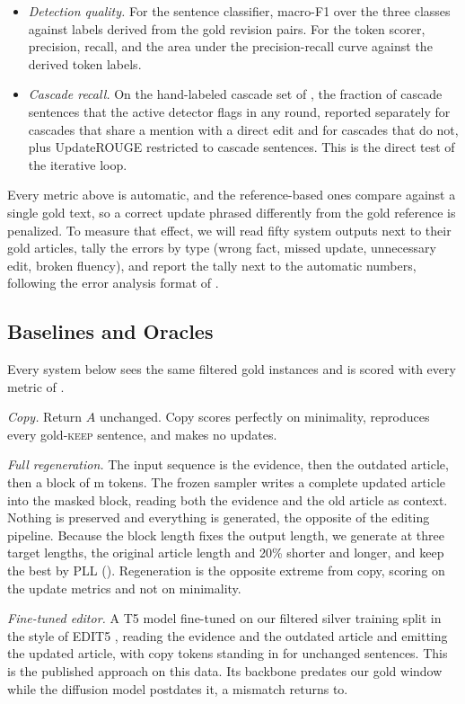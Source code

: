 \documentclass[]{paper}
\newcommand{\mask}{\ensuremath{\mathrm{m}}}
\newcommand{\keep}{\textsc{keep}}
\begin{document}
\begin{itemize}
\item \emph{Detection quality.} For the sentence classifier, macro-F1 over the three classes against labels derived from the gold revision pairs. For the token scorer, precision, recall, and the area under the precision-recall curve against the derived token labels.
\item \emph{Cascade recall.} On the hand-labeled cascade set of , the fraction of cascade sentences that the active detector flags in any round, reported separately for cascades that share a mention with a direct edit and for cascades that do not, plus UpdateROUGE restricted to cascade sentences. This is the direct test of the iterative loop.
\end{itemize}

Every metric above is automatic, and the reference-based ones compare against a single gold text, so a correct update phrased differently from the gold reference is penalized. To measure that effect, we will read fifty system outputs next to their gold articles, tally the errors by type (wrong fact, missed update, unnecessary edit, broken fluency), and report the tally next to the automatic numbers, following the error analysis format of \citet{iv-etal-2022-fruit}.

\subsection{Baselines and Oracles}
\label{sec:systems}

Every system below sees the same filtered gold instances and is scored with every metric of .

\emph{Copy.} Return $A$ unchanged. Copy scores perfectly on minimality, reproduces every gold-\keep{} sentence, and makes no updates.

\emph{Full regeneration.} The input sequence is the evidence, then the outdated article, then a block of \mask{} tokens. The frozen sampler writes a complete updated article into the masked block, reading both the evidence and the old article as context. Nothing is preserved and everything is generated, the opposite of the editing pipeline. Because the block length fixes the output length, we generate at three target lengths, the original article length and 20\% shorter and longer, and keep the best by PLL (). Regeneration is the opposite extreme from copy, scoring on the update metrics and not on minimality.

\emph{Fine-tuned editor.} A T5 model fine-tuned on our filtered silver training split in the style of EDIT5 \citep{iv-etal-2022-fruit}, reading the evidence and the outdated article and emitting the updated article, with copy tokens standing in for unchanged sentences. This is the published approach on this data. Its backbone predates our gold window while the diffusion model postdates it, a mismatch  returns to.
\end{document}
